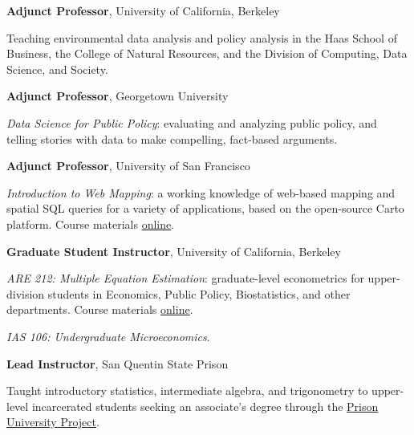 \documentclass[10pt,letterpaper]{article}
\renewenvironment{itemize}{
  \begin{list}{}{
    \setlength{\leftmargin}{1.5em}
    \setlength{\itemsep}{0.25em}
    \setlength{\parskip}{0pt}
    \setlength{\parsep}{0.25em}
  }
}{
  \end{list}
}
\begin{document}
\begin{itemize}

\item \textbf{Adjunct Professor}, University of California, Berkeley
  \begin{itemize}
  \item Teaching environmental data analysis and policy analysis in the Haas School of Business, the College of Natural Resources, and the Division of Computing, Data Science, and Society.
  \end{itemize}

\item \textbf{Adjunct Professor}, Georgetown University
  \begin{itemize}
  \item \textit{Data Science for Public Policy}: evaluating and analyzing public policy, and telling stories with data to make compelling, fact-based arguments.
  \end{itemize}

\item \textbf{Adjunct Professor}, University of San Francisco
  \begin{itemize}
  \item \textit{Introduction to Web Mapping}: a working knowledge of web-based mapping and spatial SQL queries for a variety of applications, based on the open-source Carto platform. Course materials \href{https://github.com/danhammer/web-mapping}{online}.
  \end{itemize}

\item \textbf{Graduate Student Instructor}, University of California, Berkeley
  \begin{itemize}
  \item \textit{ARE 212: Multiple Equation Estimation}: graduate-level econometrics for upper-division students in Economics, Public Policy, Biostatistics, and other departments. Course materials \href{https://github.com/danhammer/are212}{online}.
  \item \textit{IAS 106: Undergraduate Microeconomics}.
  \end{itemize}

\item \textbf{Lead Instructor}, San Quentin State Prison
  \begin{itemize}
  \item Taught introductory statistics, intermediate algebra, and trigonometry to upper-level incarcerated students seeking an associate's degree through the \href{http://prisonuniversityproject.org/home}{Prison University Project}.
  \end{itemize}


\end{itemize}
\end{document}
